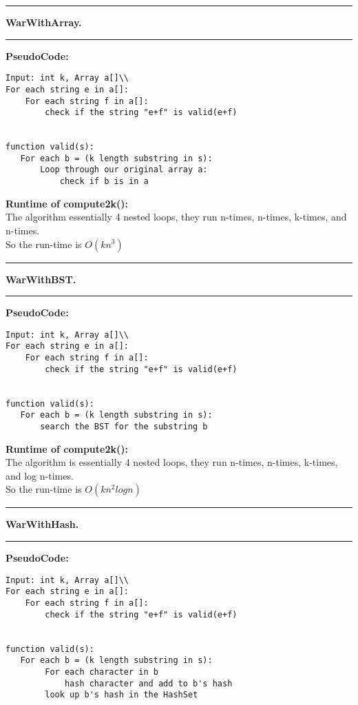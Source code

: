 \documentclass[11pt]{article}
\newcommand\question[2]{\vspace{.25in}\hrule\textbf{#1. #2}\vspace{.5em}\hrule\vspace{.10in}}
\begin{document}
\raggedright
\newcommand\NAME{Devin Johnson, Mason Wray}  %
\newcommand\HWNUM{ PA1}              %



\question{WarWithArray}{} 

\textbf{PseudoCode:}\\
\begin{verbatim}
Input: int k, Array a[]\\
For each string e in a[]:
    For each string f in a[]:
        check if the string "e+f" is valid(e+f)
    	
    	
function valid(s):
   For each b = (k length substring in s):
       Loop through our original array a:
           check if b is in a
\end{verbatim}

\textbf{Runtime of compute2k():}\\

The algorithm essentially 4 nested loops, they run n-times, n-times, k-times, and n-times.\\
So the run-time is $O(kn^3)$


\question{WarWithBST}{}

\textbf{PseudoCode:}\\

\begin{verbatim}
Input: int k, Array a[]\\
For each string e in a[]:
    For each string f in a[]:
        check if the string "e+f" is valid(e+f)
    	
    	
function valid(s):
   For each b = (k length substring in s):
       search the BST for the substring b
\end{verbatim}


\textbf{Runtime of compute2k():}\\
The algorithm is essentially 4 nested loops, they run n-times, n-times, k-times, and log n-times.\\
So the run-time is $O(kn^2logn)$

\pagebreak
\question{WarWithHash}{}

\textbf{PseudoCode:}\\
\begin{verbatim}
Input: int k, Array a[]\\
For each string e in a[]:
    For each string f in a[]:
        check if the string "e+f" is valid(e+f)
    	
    	
function valid(s):
   For each b = (k length substring in s):
   		For each character in b
       		hash character and add to b's hash
       	look up b's hash in the HashSet
\end{verbatim}
\end{document}
